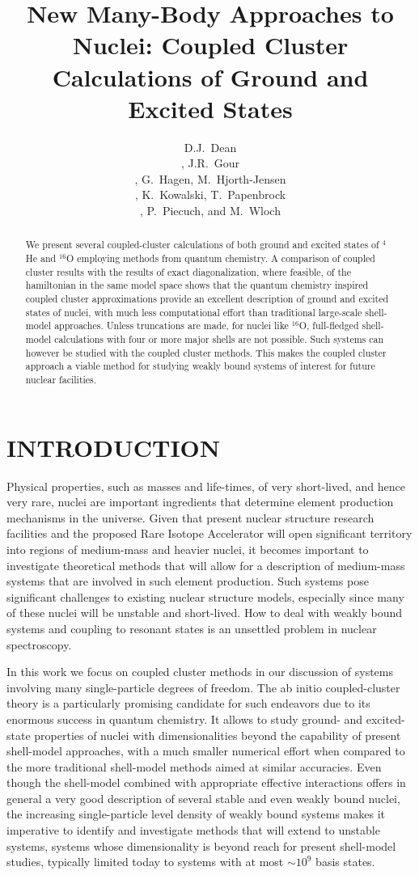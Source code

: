 \documentclass[fleqn,12pt,twoside]{article}
\title{New Many-Body Approaches to Nuclei: Coupled Cluster Calculations of  
Ground and Excited States}
\author{
D.J.~Dean\address[ORNL]{Physics Division, Oak Ridge National Laboratory,
P.O. Box 2008, Oak Ridge, TN 37831, USA}\address[OSLO1]{Center of Mathematics for Applications, 
University of Oslo, N-0316 Oslo, Norway},
J.R.~Gour\address[MSUCEM]{Department of Chemistry, Michigan State University, East Lansing, MI 48824, USA},
G.~Hagen\addressmark[OSLO1],
M.~Hjorth-Jensen\addressmark[OSLO1]\address[OSLO2]{Department of Physics, 
University of Oslo, N-0316 Oslo, Norway}\address[CERN]{PH Division, CERN, 
CH-1211 Geneve 23, Switzerland}\address[MSUPH]{Department of Physics and Astronomy, 
Michigan State University, East Lansing, MI 48824, USA}, 
K.~Kowalski\addressmark[MSUCEM], 
T.~Papenbrock\addressmark[ORNL]\address[UTK]{Department of Physics and Astronomy, University of 
Tennessee, Knoxville, TN 37996, USA}, 
P.~Piecuch\addressmark[MSUCEM]\addressmark[MSUPH], and M.~Wloch\addressmark[MSUCEM]}
\begin{document}
\maketitle

\begin{abstract}
We present several coupled-cluster calculations of both ground and excited states 
of $^4$He and $^{16}$O employing methods from quantum chemistry. 
A comparison
of coupled cluster results with the results of exact
diagonalization, where feasible, of the hamiltonian in the same model space shows that
the quantum chemistry inspired coupled cluster approximations provide
an excellent description of ground and excited states of nuclei, with much less computational
effort than traditional large-scale shell-model approaches. Unless truncations are made, 
for nuclei like  $^{16}$O,
full-fledged shell-model calculations with four or more major shells are not possible.
Such systems can however be studied with the coupled cluster methods. 
This makes the coupled cluster approach a viable method for studying weakly bound systems of interest
for future nuclear facilities.
\end{abstract}

\section{INTRODUCTION}

Physical properties, such as masses and life-times,
of very short-lived, and hence very rare, nuclei are important
ingredients that determine element production mechanisms in
the universe. Given that present nuclear structure research facilities
and the proposed Rare Isotope Accelerator will open significant
territory into regions of medium-mass and heavier nuclei,
it becomes important to investigate theoretical methods that will allow
for a description of medium-mass systems that are involved in such
element production. Such systems pose significant
challenges to existing nuclear structure models, especially since many of
these nuclei will be unstable and short-lived. How to deal with weakly
bound systems and coupling to resonant states is an unsettled problem in
nuclear spectroscopy.

In this work we focus on coupled cluster methods in our discussion of systems involving many 
single-particle degrees of freedom. 
The ab initio coupled-cluster theory is a particularly promising
candidate for such endeavors due to its enormous success in quantum
chemistry. It allows to study ground- and 
excited-state properties
of nuclei
with dimensionalities beyond the capability of present shell-model
approaches, with a much smaller numerical effort when compared to
the more traditional shell-model methods aimed at similar accuracies.
Even though the shell-model combined with appropriate effective interactions
offers in general a very good description of several stable and even weakly 
bound nuclei, the increasing single-particle level density of weakly bound systems
makes it imperative to 
identify and investigate methods that will extend to unstable systems,
systems whose dimensionality is beyond reach for present shell-model studies, 
typically limited today to  systems with at most $\sim 10^9$ basis states.
\end{document}
